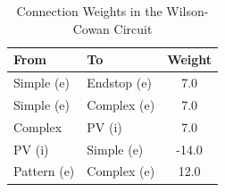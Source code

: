 \documentclass[12pt]{article}
\begin{document}
\begin{table}[h]
  \centering
  \caption{Connection Weights in the Wilson-Cowan Circuit}
  \label{tab:weights}
  \begin{tabular}{@{}llc@{}}
      \toprule
      \textbf{From} & \textbf{To} & \textbf{Weight} \\ \midrule
      Simple (e) & Endstop (e) & 7.0 \\
      Simple (e) & Complex (e) & 7.0 \\
      Complex & PV (i) & 7.0 \\
      PV (i) & Simple (e) & -14.0 \\
      Pattern (e) & Complex (e) & 12.0 \\ \bottomrule
  \end{tabular}
\end{table}
\end{document}
